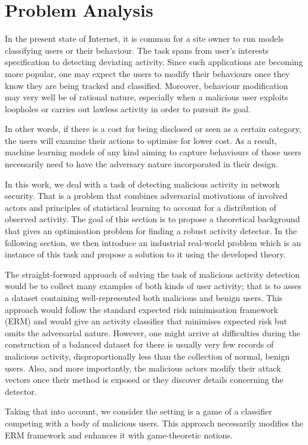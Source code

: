 \section{Problem Analysis}\label{sec:problem_analysis}
In the present state of Internet, it is common for a site owner to run
models classifying users or their behaviour. The task spans from user’s
interests specification to detecting deviating activity. Since such
applications are becoming more popular, one may expect the users to
modify their behaviours once they know they are being tracked and
classified. Moreover, behaviour modification may very well be of
rational nature, especially when a malicious user exploits loopholes or
carries out lawless activity in order to pursuit its goal.

In other words, if there is a cost for being disclosed or seen as a
certain category, the users will examine their actions to optimise for
lower cost. As a result, machine learning models of any kind aiming to
capture behaviours of those users necessarily need to have the adversary
nature incorporated in their design.

In this work, we deal with a task of detecting malicious activity in network security. That is a problem that combines adversarial motivations of involved actors and principles of statistical learning to account for a distribution of observed activity. The goal of this section is to propose a theoretical background that gives an optimisation problem for finding a robust activity detector. In the following section, we then introduce an industrial real-world problem which is an instance of this task and propose a solution to it using the developed theory.

The straight-forward approach of solving the task of malicious activity detection would be to collect
many examples of both kinds of user activity; that is to asses a dataset
containing well-represented both malicious and benign users. This
approach would follow the standard expected risk minimisation framework (ERM) and would give an activity classifier that minimises expected risk but omits the
adversarial nature. However, one might arrive at difficulties during the
construction of a balanced dataset for there is usually very few records
of malicious activity, disproportionally less than the collection of
normal, benign users. Also, and more importantly, the malicious actors
modify their attack vectors once their method is exposed or they
discover details concerning the detector.

Taking that into account, we consider the setting is a game of a classifier
competing with a body of malicious users. This approach necessarily
modifies the ERM framework and enhances it with game-theoretic notions.

